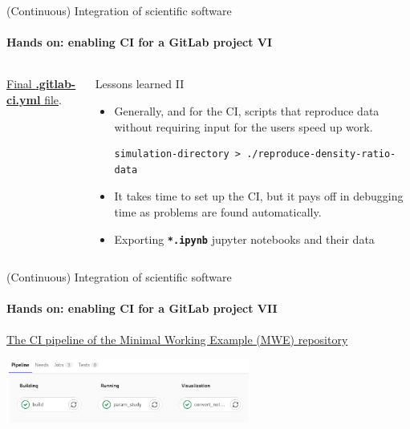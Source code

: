 \begin{frame}[fragile]{(Continuous) Integration of scientific software} 
    \framesubtitle{Hands on: enabling CI for a GitLab project VI} 
    \vfill

    \begin{columns}
        \begin{column}[c]{0.5\textwidth}
    \href{https://gitlab.com/tmaric/minimal-cse-ci-examples/-/blob/01-with-ci/.gitlab-ci.yml}{Final \textbf{.gitlab-ci.yml} file}. 
        \end{column}
        \begin{column}[c]{0.5\textwidth}
            Lessons learned II
            \begin{itemize}
                \item Generally, and for the CI, scripts that reproduce data without requiring input for the users speed up work.
                    \begin{verbatim}
simulation-directory > ./reproduce-density-ratio-data
                    \end{verbatim}
                \item It takes time to set up the CI, but it pays off in debugging time as problems are found automatically. 
                \item Exporting \textbf{\texttt{*.ipynb}} jupyter notebooks and their data  
            \end{itemize}
        \end{column}
    \end{columns}

\end{frame}

\begin{frame}[fragile]{(Continuous) Integration of scientific software} 
    \framesubtitle{Hands on: enabling CI for a GitLab project VII} 
    \vfill

    \href{https://gitlab.com/tmaric/minimal-cse-ci-examples/-/pipelines/374606049}{The CI pipeline of the Minimal Working Example (MWE) repository}

    \medskip
    \centering
    \includegraphics[width=0.6\textwidth]{figures/mwe-pipeline.png}

\end{frame}
